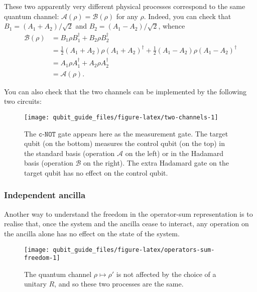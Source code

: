 \documentclass[fleqn]{article}
\begin{document}
These two apparently very different physical processes correspond to the same quantum channel: \(\mathcal{A}(\rho)=\mathcal{B}(\rho)\) for any \(\rho\).
Indeed, you can check that \(B_1=(A_1+A_2)/\sqrt{2}\) and \(B_2=(A_1-A_2)/\sqrt{2}\), whence
\[
  \begin{aligned}
    \mathcal{B}(\rho)
    &= B_1\rho B_1^\dagger + B_2\rho B_2^\dagger
  \\&= \frac{1}{2} (A_1+A_2)\rho (A_1+A_2)^\dagger + \frac{1}{2} (A_1-A_2)\rho (A_1-A_2)^\dagger
  \\&=  A_1\rho A_1^\dagger + A_2\rho A_2^\dagger
  \\&= \mathcal{A}(\rho).
  \end{aligned}
\]

You can also check that the two channels can be implemented by the following two circuits:



\begin{figure}[H]

{\centering \texttt{[image: qubit\_guide\_files/figure-latex/two-channels-1]} 

}

\caption{The \(\texttt{c-NOT}\) gate appears here as the measurement gate. The target qubit (on the bottom) measures the control qubit (on the top) in the standard basis (operation \(\mathcal{A}\) on the left) or in the Hadamard basis (operation \(\mathcal{B}\) on the right). The extra Hadamard gate on the target qubit has no effect on the control qubit.}\label{fig:two-channels}
\end{figure}

\hypertarget{independent-ancilla}{%
\subsubsection{Independent ancilla}\label{independent-ancilla}}

Another way to understand the freedom in the operator-sum representation is to realise that, once the system and the ancilla cease to interact, any operation on the ancilla alone has no effect on the state of the system.



\begin{figure}[H]

{\centering \texttt{[image: qubit\_guide\_files/figure-latex/operators-sum-freedom-1]} 

}

\caption{The quantum channel \(\rho\mapsto\rho'\) is not affected by the choice of a unitary \(R\), and so these two processes are the same.}\label{fig:operators-sum-freedom}
\end{figure}
\end{document}
